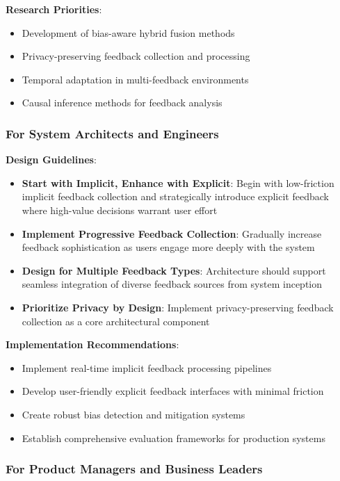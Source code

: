 \textbf{Research Priorities}:
\begin{itemize}
    \item Development of bias-aware hybrid fusion methods
    \item Privacy-preserving feedback collection and processing
    \item Temporal adaptation in multi-feedback environments
    \item Causal inference methods for feedback analysis
\end{itemize}

\subsubsection{For System Architects and Engineers}

\textbf{Design Guidelines}:
\begin{itemize}
    \item \textbf{Start with Implicit, Enhance with Explicit}: Begin with low-friction implicit feedback collection and strategically introduce explicit feedback where high-value decisions warrant user effort
    \item \textbf{Implement Progressive Feedback Collection}: Gradually increase feedback sophistication as users engage more deeply with the system
    \item \textbf{Design for Multiple Feedback Types}: Architecture should support seamless integration of diverse feedback sources from system inception
    \item \textbf{Prioritize Privacy by Design}: Implement privacy-preserving feedback collection as a core architectural component
\end{itemize}

\textbf{Implementation Recommendations}:
\begin{itemize}
    \item Implement real-time implicit feedback processing pipelines
    \item Develop user-friendly explicit feedback interfaces with minimal friction
    \item Create robust bias detection and mitigation systems
    \item Establish comprehensive evaluation frameworks for production systems
\end{itemize}

\subsubsection{For Product Managers and Business Leaders}

